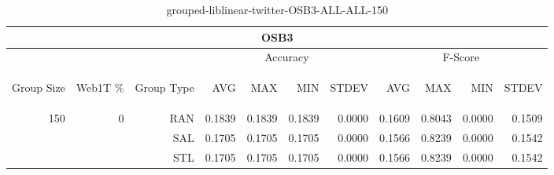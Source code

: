 \begin{center}
\begin{table}[htbp] 
 \begin{center}
\begin{tabular}{ | r | r | r | r | r | r | r | r | r | r | r |}
\hline
\multicolumn{11}{|c|}{OSB3}\\
\hline
 & & & \multicolumn{4}{|c|}{Accuracy} & \multicolumn{4}{|c|}{F-Score}\\ \cline{4-11}
\begin{sideways}Group Size\end{sideways} & \begin{sideways}Web1T \%\end{sideways} & \begin{sideways}Group Type\end{sideways} & \begin{sideways}AVG\end{sideways} & \begin{sideways}MAX\end{sideways} & \begin{sideways}MIN\end{sideways} & \begin{sideways}STDEV\end{sideways} & \begin{sideways}AVG\end{sideways} & \begin{sideways}MAX\end{sideways} & \begin{sideways}MIN\end{sideways} & \begin{sideways}STDEV\end{sideways}\\
\hline
\multirow{3}{*}{150}
 & \multirow{3}{*}{0} & RAN & 0.1839 & 0.1839 & 0.1839 & 0.0000 & 0.1609 & 0.8043 & 0.0000 & 0.1509\\ \cline{3-11}
 &   & SAL & 0.1705 & 0.1705 & 0.1705 & 0.0000 & 0.1566 & 0.8239 & 0.0000 & 0.1542\\ \cline{3-11}
 &   & STL & 0.1705 & 0.1705 & 0.1705 & 0.0000 & 0.1566 & 0.8239 & 0.0000 & 0.1542\\ \cline{2-11}
\hline
\end{tabular}
\caption{grouped-liblinear-twitter-OSB3-ALL-ALL-150}
\end{center}
 \end{table}
\end{center}

